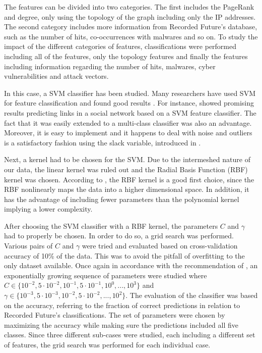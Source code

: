 The features can be divided into two categories. The first includes the PageRank and degree, only using the topology of the graph including only the IP addresses. The second category includes more information from Recorded Future's database, such as the number of hits, co-occurrences with malwares and so on. To study the impact of the different categories of features, classifications were performed including all of the features, only the topology features and finally the features including information regarding the number of hits, malwares, cyber vulnerabilities and attack vectors.

In this case, a SVM classifier has been studied. Many researchers have used SVM for feature classification and found good results \citep{campbell2011,liu2012}. For instance, \citet{liu2012} showed promising results predicting links in a social network based on a SVM feature classifier. The fact that it was easily extended to a multi-class classifier was also an advantage. Moreover, it is easy to implement and it happens to deal with noise and outliers is a satisfactory fashion using the slack variable, introduced in .

Next, a kernel had to be chosen for the SVM. Due to the intermeshed nature of our data, the linear kernel was ruled out and the Radial Basis Function (RBF) kernel was chosen. According to \citet{Hsu10apractical}, the RBF kernel is a good first choice, since the RBF nonlinearly maps the data into a higher dimensional space. In addition, it has the advantage of including fewer parameters than the polynomial kernel implying a lower complexity.

After choosing the SVM classifier with a RBF kernel, the parameters $C$ and $\gamma$ had to properly be chosen. In order to do so, a grid search was performed. Various pairs of $C$ and $\gamma$ were tried and evaluated based on cross-validation accuracy of 10\% of the data. This was to avoid the pitfall of overfitting to the only dataset available. Once again in accordance with the recommendation of \citet{Hsu10apractical}, an exponentially growing sequence of parameters were studied where $C\in\{10^{-2},5\cdot10^{-2},10^{-1},5\cdot10^{-1},10^{0},...,10^{3}\}$ and $\gamma\in\{10^{-3},5\cdot10^{-3},10^{-2},5\cdot10^{-2},...,10^{2}\}$. The evaluation of the classifier was based on the accuracy, referring to the fraction of correct predictions in relation to Recorded Future's classifications. The set of parameters were chosen by maximizing the accuracy while making sure the predictions included all five classes. Since three different sub-cases were studied, each including a different set of features, the grid search was performed for each individual case. 

